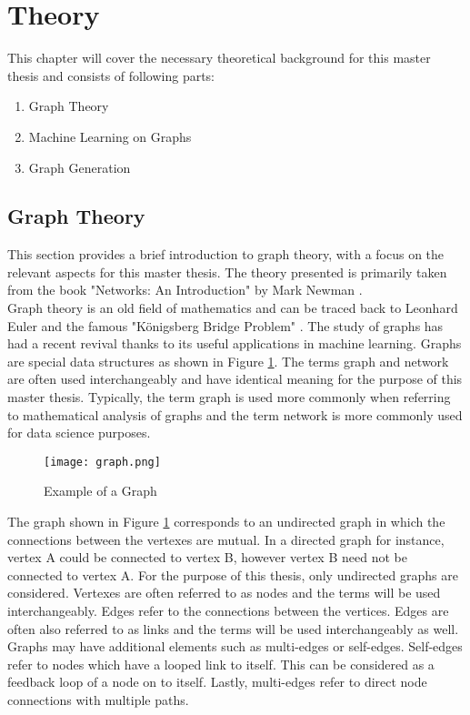 
	\section{Theory}

	This chapter will cover the necessary theoretical background for this
	master thesis and consists of following parts:

	\begin{enumerate}
		\item Graph Theory
		\item Machine Learning on Graphs
		\item Graph Generation
    \end{enumerate}

	\subsection{Graph Theory}

	This section provides a brief introduction to graph theory, with a focus on
	the relevant aspects for this master thesis. The theory presented is
	primarily taken from the book "Networks: An Introduction" by Mark Newman
	\citeyearpar{Newman2010}. \\

	\noindent Graph theory is an old field of mathematics and can be traced back 
	to Leonhard Euler and the famous "Königsberg Bridge Problem"
	\citep{euler1741solutio}. The study of graphs has had a recent revival
	thanks to its useful applications in machine learning. Graphs are special 
	data structures as shown in Figure \ref{fig:graph}. The terms graph and network 
	are often used interchangeably and have identical meaning for the purpose
	of this master thesis. Typically, the term graph is used more commonly when 
	referring to mathematical analysis of graphs and the term network is more 
	commonly used for data science purposes. \\

	\begin{figure}[h]
		\centering
		\texttt{[image: graph.png]}
		\caption{Example of a Graph}
		\cite[p. 111]{Newman2010}
		\label{fig:graph}
	\end{figure}
	
	\noindent The graph shown in Figure \ref{fig:graph} corresponds to an undirected graph
	in which the connections between the vertexes are mutual. In a directed
	graph for instance, vertex A could be connected to vertex B, however vertex
	B need not be connected to vertex A. For the purpose of this thesis, only
	undirected graphs are considered. Vertexes are often referred to as
	nodes and the terms will be used interchangeably. Edges refer to the
	connections between the vertices. Edges are often also referred to as links
	and the terms will be used interchangeably as well. Graphs may have
	additional elements such as multi-edges or self-edges. Self-edges refer to
	nodes which have a looped link to itself. This can be considered as a feedback
	loop of a node on to itself. Lastly, multi-edges refer to direct node 
	connections with multiple paths. \\

